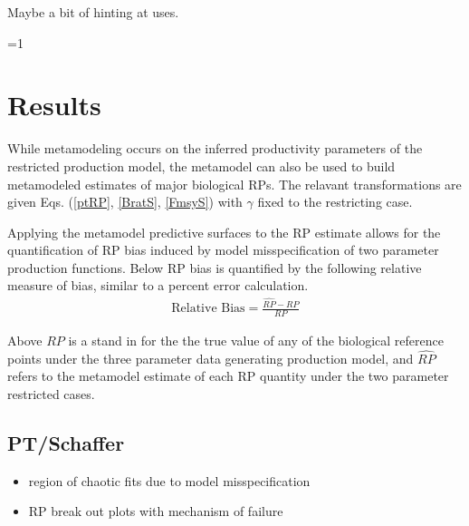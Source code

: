 \documentclass[12pt]{article}
\newcounter{alphasect}
\def\alphainsection{0}
\let\oldsection=\section
\def\section{%
  \ifnum\alphainsection=1%
    \addtocounter{alphasect}{1}
  \fi%
\oldsection}%
\begin{document}
%
{\color{blue} Maybe a bit of hinting at uses}.

%
%

\section{Results}


%
While metamodeling occurs on the inferred productivity parameters of the 
restricted production model, the metamodel can also be used to build 
metamodeled estimates of major biological RPs. The relavant transformations 
are given Eqs. (\ref{ptRP}, \ref{BratS}, \ref{FmsyS}) with $\gamma$ 
fixed to the restricting case. 


%
Applying the metamodel predictive surfaces to the RP estimate allows for the 
quantification of RP bias induced by model misspecification of two parameter 
production functions. Below RP bias is quantified by the following relative 
measure of bias, similar to a percent error calculation.
%
\begin{align}
\text{Relative Bias} = \frac{\hat{RP}-RP}{RP}
\end{align}

%
Above $RP$ is a stand in for the the true value of any of the biological
reference points under the three parameter data generating production model, 
and $\hat{RP}$ refers to the metamodel estimate of each RP quantity under the 
two parameter restricted cases.

%
\subsection{PT/Schaffer}
\begin{itemize}
	\item[~] region of chaotic fits due to model misspecification
	\item RP break out plots with mechanism of failure
\end{itemize}
\end{document}
